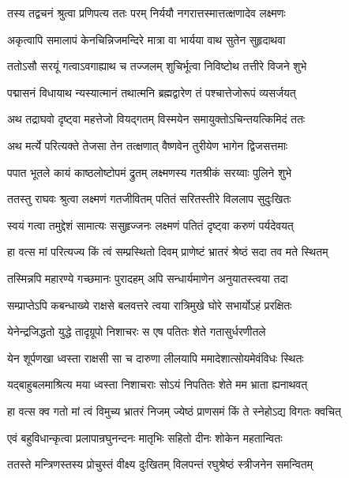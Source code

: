 \twolineshloka
{तस्य तद्वचनं श्रुत्वा प्रणिपत्य ततः परम्}
{निर्ययौ नगरात्तस्मात्तत्क्षणादेव लक्ष्मणः}%

\twolineshloka
{अकृत्वापि समालापं केनचिन्निजमन्दिरे}
{मात्रा वा भार्यया वाथ सुतेन सुहृदाथवा}%

\twolineshloka
{ततोऽसौ सरयूं गत्वाऽवगाह्याथ च तज्जलम्}
{शुचिर्भूत्वा निविष्टोथ तत्तीरे विजने शुभे}%

\twolineshloka
{पद्मासनं विधायाथ न्यस्यात्मानं तथात्मनि}
{ब्रह्मद्वारेण तं पश्चात्तेजोरूपं व्यसर्जयत्}%

\twolineshloka
{अथ तद्राघवो दृष्ट्वा महत्तेजो वियद्गतम्}
{विस्मयेन समायुक्तोऽचिन्तयत्किमिदं ततः}%

\twolineshloka
{अथ मर्त्ये परित्यक्ते तेजसा तेन तत्क्षणात्}
{वैष्णवेन तुरीयेण भागेन द्विजसत्तमाः}%

\twolineshloka
{पपात भूतले कायं काष्ठलोष्टोपमं द्रुतम्}
{लक्ष्मणस्य गतश्रीकं सरय्वाः पुलिने शुभे}%

\twolineshloka
{ततस्तु राघवः श्रुत्वा लक्ष्मणं गतजीवितम्}
{पतितं सरितस्तीरे विललाप सुदुःखितः}%

\twolineshloka
{स्वयं गत्वा तमुद्देशं सामात्यः ससुहृज्जनः}
{लक्ष्मणं पतितं दृष्ट्वा करुणं पर्यदेवयत्}%

\twolineshloka
{हा वत्स मां परित्यज्य किं त्वं सम्प्रस्थितो दिवम्}
{प्राणेष्टं भ्रातरं श्रेष्ठं सदा तव मते स्थितम्}%

\twolineshloka
{तस्मिन्नपि महारण्ये गच्छमानः पुरादहम्}
{अपि सन्धार्यमाणेन अनुयातस्त्वया तदा}%

\twolineshloka
{सम्प्राप्तेऽपि कबन्धाख्ये राक्षसे बलवत्तरे}
{त्वया रात्रिमुखे घोरे सभार्योऽहं प्ररक्षितः}%

\twolineshloka
{येनेन्द्रजिद्धतो युद्धे तादृग्रूपो निशाचरः}
{स एष पतितः शेते गतासुर्धरणीतले}%

\twolineshloka
{येन शूर्पणखा ध्वस्ता राक्षसी सा च दारुणा}
{लीलयापि ममादेशात्सोयमेवंविधः स्थितः}%

\twolineshloka
{यद्बाहुबलमाश्रित्य मया ध्वस्ता निशाचराः}
{सोऽयं निपतितः शेते मम भ्राता ह्यनाथवत्}%

\twolineshloka
{हा वत्स क्व गतो मां त्वं विमुच्य भ्रातरं निजम्}
{ज्येष्ठं प्राणसमं किं ते स्नेहोऽद्य विगतः क्वचित्}%


\twolineshloka
{एवं बहुविधान्कृत्वा प्रलापान्रघुनन्दनः}
{मातृभिः सहितो दीनः शोकेन महतान्वितः}%

\twolineshloka
{ततस्ते मन्त्रिणस्तस्य प्रोचुस्तं वीक्ष्य दुःखितम्}
{विलपन्तं रघुश्रेष्ठं स्त्रीजनेन समन्वितम्}%

